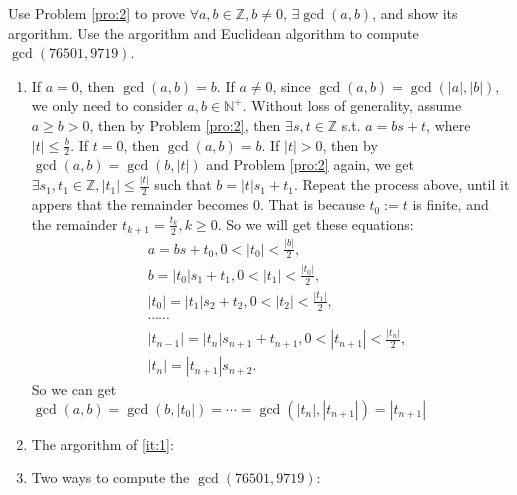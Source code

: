 \documentclass{ctexart}
\begin{document}
\begin{problem}
Use Problem \ref{pro:2} to prove \(\forall a,b \in \mathbb{Z}, b \neq 0\), \(\exists \gcd(a,b)\), and show its argorithm.
Use the argorithm and Euclidean algorithm to compute \(\gcd(76501,9719)\).
\end{problem}
\begin{solution}
	\begin{enumerate}
		\item \label{it:1} If \(a =0\), then \(\gcd(a,b) = b\).
		      If \(a \neq 0\), since \(\gcd(a,b) = \gcd(|a|,|b|)\), we only need to consider \(a,b \in \mathbb{N}^+\).
		      Without loss of generality, assume \(a \geq b > 0\), then by
		      Problem \ref{pro:2}, then \(\exists s, t \in \mathbb{Z}\) s.t. \(a = bs + t\), where \(|t| \leq \frac{b}{2}\).
		      If \(t=0\), then \(\gcd(a,b) =b\). If \(|t| >0\), then by \(\gcd(a,b) = \gcd(b,|t|)\) and Problem \ref{pro:2} again, we get \(\exists s_1,t_1 \in \mathbb{Z}, |t_1| \leq \frac{|t|}{2}\) such that
		      \(b = |t|s_1 + t_1\). Repeat the process above, until it appers that the remainder becomes \(0\).
		      That is because \(t_0:=t\) is finite, and the remainder \( t_{k + 1} = \frac{t_k}{2}, k \geq 0\).
		      So we will get these equations:
		      \begin{equation}
			      \begin{aligned}
				       & a = bs + t_0, 0 < |t_0| < \frac{|b|}{2},                           \\
				       & b = |t_0|s_1 + t_1, 0 < |t_1| < \frac{|t_0|}{2},                   \\
				       & |t_0| = |t_1|s_2 + t_2, 0 < |t_2| < \frac{|t_1|}{2},               \\
				       & \cdots\cdots                                                       \\
				       & |t_{n-1}| = |t_{n}|s_{n+1}+t_{n+1}, 0< |t_{n+1}| <\frac{|t_n|}{2}, \\
				       & |t_{n}| = |t_{n+1}|s_{n+2}.
			      \end{aligned}
		      \end{equation}
		      So we can get \(\gcd(a,b)=\gcd(b,|t_0|)=\cdots=\gcd(|t_n|,|t_{n+1}|)=|t_{n+1}|\)
		\item The argorithm of \ref{it:1}:
		      
		\item Two ways to compute the \(\gcd(76501,9719)\):\\
		      \begin{enumerate}

\end{enumerate}
\end{enumerate}
\end{solution}
\end{document}
